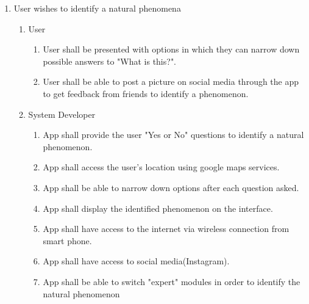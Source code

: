 \documentclass[]{article}
\begin{document}
\begin{enumerate}[{BE}1.]
\begin{enumerate} [{VP3}.1]
			\begin{enumerate}
				\item User shall be able to view saved pictures through the app and the phone.
				\item User shall be able delete pictures from the app and the phone.
			\end{enumerate}
		\item System Developer
			\begin{enumerate}
				\item Application shall display requested pictures to the user.
				\item Application shall be able to delete pictures directly on the phone.
			\end{enumerate}
	\end{enumerate}
	\item User wishes to identify a natural phenomena
	\begin{enumerate}[{VP4}.1]
		\item User
			\begin{enumerate}
				\item User shall be presented with options in which they can narrow down possible answers to "What is this?".
				\item User shall be able to post a picture on social media through the app to get feedback from friends to identify a phenomenon.
								
			\end{enumerate}
		\item System Developer
			\begin{enumerate}
				\item App shall provide the user "Yes or No" questions to identify a natural phenomenon.
				\item App shall access the user's location using google maps services.
				\item App shall be able to narrow down options after each question asked. 
				\item App shall display the identified phenomenon on the interface.
				\item App shall have access to the internet via wireless connection from smart phone.
				\item App shall have access to social media(Instagram). 
				\item App shall be able to switch "expert" modules in order to identify the natural phenomenon
				
			\end{enumerate}
	\end{enumerate}
\end{enumerate}
\end{document}
